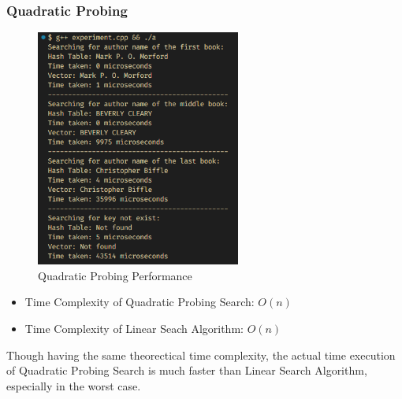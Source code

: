 \subsubsection*{Quadratic Probing}
\begin{figure}[H]
	\centering
	\includegraphics[width=0.6\textwidth]{images/quadratic_prob/experiment.png}
	\caption{Quadratic Probing Performance}
\end{figure}
\begin{itemize}
	\item Time Complexity of Quadratic Probing Search: \(O(n)\)
	\item Time Complexity of Linear Seach Algorithm: \(O(n)\)
\end{itemize}
Though having the same theorectical time complexity, the actual time execution of Quadratic Probing Search is much faster than Linear Search Algorithm, especially in the worst case.

